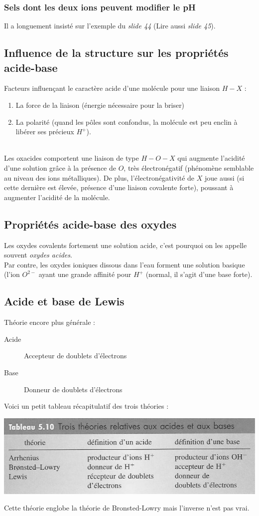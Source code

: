 \documentclass[12pt, a4paper]{article}
\begin{document}
\subsubsection{Sels dont les deux ions peuvent modifier le pH}
Il a longuement insisté sur l'exemple du \textit{slide 44} (Lire aussi \textit{slide 45}).

\subsection{Influence de la structure sur les propriétés acide-base}
Facteurs influençant le caractère acide d'une molécule pour une liaison $H-X$ : 
\begin{enumerate}
\item La force de la liaison (énergie nécessaire pour la briser)
\item La polarité (quand les pôles sont confondus, la molécule est peu enclin à libérer ses précieux $H^+$).
\end{enumerate}
\ \\
Les oxacides comportent une liaison de type $H-O-X$ qui augmente l'acidité d'une solution grâce à la présence de $O$, très électronégatif (phénomène semblable au niveau des ions métalliques). De plus, l'électronégativité de $X$ joue aussi (si cette dernière est élevée, présence d'une liaison covalente forte), poussant à augmenter l'acidité de la molécule.

\subsection{Propriétés acide-base des oxydes}
Les oxydes covalents fortement une solution acide, c'est pourquoi on les appelle souvent \textit{oxydes acides}.\\
Par contre, les oxydes ioniques dissous dans l'eau forment une solution basique (l'ion $O^{2-}$ ayant une grande affinité pour $H^+$ (normal, il s'agit d'une base forte). 

\subsection{Acide et base de Lewis}
Théorie encore plus générale :
\begin{description}
\item[Acide] Accepteur de doublets d'électrons
\item[Base] Donneur de doublets d'électrons
\end{description}
Voici un petit tableau récapitulatif des trois théories : 
\begin{center}
\includegraphics[scale=0.55]{image13.png}\\
\end{center}
Cette théorie englobe la théorie de Bronsted-Lowry mais l'inverse n'est pas vrai.
\end{document}
